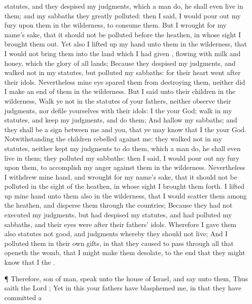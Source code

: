 {statutes, and they
despised my
judgments, which
{} a
man
do, he shall even
live in them; and my
sabbaths they
greatly
polluted: then I
said, I would pour
out my
fury upon them in the
wilderness, to
consume them.
But I
wrought for my
name’s sake, that it should not be
polluted
before the
heathen, in whose
sight I brought them
out.
Yet also I lifted
up my
hand unto them in the
wilderness, that I would not
bring them into the
land which I had
given
{},
flowing with
milk and
honey, which
{} the
glory of all
lands;
Because they
despised my
judgments, and
walked not in my
statutes, but
polluted my
sabbaths: for their
heart
went
after their
idols.
Nevertheless mine
eye
spared them from
destroying them, neither did I
make an
end of them in the
wilderness.
But I
said unto their
children in the
wilderness,
Walk ye not in the
statutes of your
fathers, neither
observe their
judgments, nor
defile yourselves with their
idols:
I
{} the
{} your
God;
walk in my
statutes, and
keep my
judgments, and
do them;
And
hallow my
sabbaths; and they shall be a
sign between me and you, that ye may
know that I
{} the
{} your
God.
Notwithstanding the
children
rebelled against me: they
walked not in my
statutes, neither
kept my
judgments to
do them, which
{} a
man
do, he shall even
live in them; they
polluted my
sabbaths: then I
said, I would pour
out my
fury upon them, to
accomplish my
anger against them in the
wilderness.
Nevertheless I
withdrew mine
hand, and
wrought for my
name’s sake, that it should not be
polluted in the
sight of the
heathen, in whose
sight I brought them
forth.
I lifted
up mine
hand unto them also in the
wilderness, that I would
scatter them among the
heathen, and
disperse them through the
countries;
Because they had not
executed my
judgments, but had
despised my
statutes, and had
polluted my
sabbaths, and their
eyes were
after their
fathers’
idols.
Wherefore I
gave them also
statutes
{} not
good, and
judgments whereby they should not
live;
And I
polluted them in their own
gifts, in that they caused to pass
through
{} all that
openeth the
womb, that I might make them
desolate, to the end that they might
know that I
{} the
{}.
\par }{\PP {}¶ Therefore,
son of
man,
speak unto the
house of
Israel, and
say unto them, Thus
saith the
Lord
{}; Yet in this your
fathers have
blasphemed me, in that they have
committed a
}
